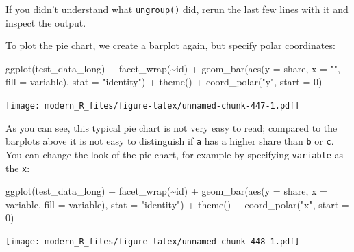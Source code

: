 \documentclass[
]{article}
\newenvironment{Shaded}{\begin{snugshade}}{\end{snugshade}}
\newcommand{\AttributeTok}[1]{\textcolor[rgb]{0.77,0.63,0.00}{#1}}
\newcommand{\DecValTok}[1]{\textcolor[rgb]{0.00,0.00,0.81}{#1}}
\newcommand{\FunctionTok}[1]{\textcolor[rgb]{0.00,0.00,0.00}{#1}}
\newcommand{\NormalTok}[1]{#1}
\newcommand{\SpecialCharTok}[1]{\textcolor[rgb]{0.00,0.00,0.00}{#1}}
\newcommand{\StringTok}[1]{\textcolor[rgb]{0.31,0.60,0.02}{#1}}
\begin{document}
If you didn't understand what \texttt{ungroup()} did, rerun the last few lines with it and inspect the
output.

To plot the pie chart, we create a barplot again, but specify polar coordinates:

\begin{Shaded}
\begin{Highlighting}[]
\FunctionTok{ggplot}\NormalTok{(test\_data\_long) }\SpecialCharTok{+}
  \FunctionTok{facet\_wrap}\NormalTok{(}\SpecialCharTok{\textasciitilde{}}\NormalTok{id) }\SpecialCharTok{+}
  \FunctionTok{geom\_bar}\NormalTok{(}\FunctionTok{aes}\NormalTok{(}\AttributeTok{y =}\NormalTok{ share, }\AttributeTok{x =} \StringTok{""}\NormalTok{, }\AttributeTok{fill =}\NormalTok{ variable), }\AttributeTok{stat =} \StringTok{"identity"}\NormalTok{) }\SpecialCharTok{+}
  \FunctionTok{theme}\NormalTok{() }\SpecialCharTok{+}
  \FunctionTok{coord\_polar}\NormalTok{(}\StringTok{"y"}\NormalTok{, }\AttributeTok{start =} \DecValTok{0}\NormalTok{)}
\end{Highlighting}
\end{Shaded}

\texttt{[image: modern\_R\_files/figure-latex/unnamed-chunk-447-1.pdf]}

As you can see, this typical pie chart is not very easy to read; compared to the barplots above it
is not easy to distinguish if \texttt{a} has a higher share than \texttt{b} or \texttt{c}. You can change the look of the
pie chart, for example by specifying \texttt{variable} as the \texttt{x}:

\begin{Shaded}
\begin{Highlighting}[]
\FunctionTok{ggplot}\NormalTok{(test\_data\_long) }\SpecialCharTok{+}
  \FunctionTok{facet\_wrap}\NormalTok{(}\SpecialCharTok{\textasciitilde{}}\NormalTok{id) }\SpecialCharTok{+}
  \FunctionTok{geom\_bar}\NormalTok{(}\FunctionTok{aes}\NormalTok{(}\AttributeTok{y =}\NormalTok{ share, }\AttributeTok{x =}\NormalTok{ variable, }\AttributeTok{fill =}\NormalTok{ variable), }\AttributeTok{stat =} \StringTok{"identity"}\NormalTok{) }\SpecialCharTok{+}
  \FunctionTok{theme}\NormalTok{() }\SpecialCharTok{+}
  \FunctionTok{coord\_polar}\NormalTok{(}\StringTok{"x"}\NormalTok{, }\AttributeTok{start =} \DecValTok{0}\NormalTok{)}
\end{Highlighting}
\end{Shaded}

\texttt{[image: modern\_R\_files/figure-latex/unnamed-chunk-448-1.pdf]}
\end{document}
